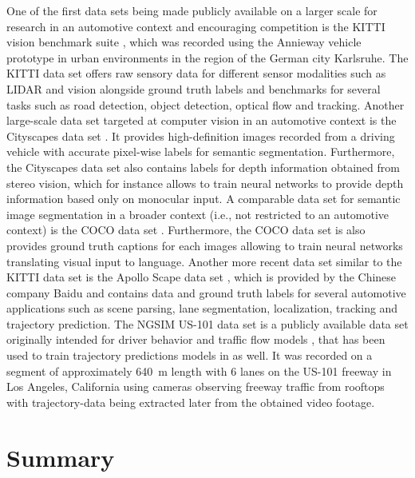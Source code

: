 One of the first data sets being made publicly available on a larger scale for research in an automotive context and encouraging competition is the KITTI vision benchmark suite \parencite{Geiger2013a}, which was recorded using the Annieway vehicle prototype  in urban environments in the region of the German city Karlsruhe.
The KITTI data set offers raw sensory data for different sensor modalities such as \ac{LIDAR} and vision alongside ground truth labels and benchmarks for several tasks such as road detection, object detection, optical flow and tracking.
Another large-scale data set targeted at computer vision in an automotive context is the Cityscapes data set \parencite{Cordts2016}. 
It provides high-definition images recorded from a driving vehicle with accurate pixel-wise labels for semantic segmentation.
Furthermore, the Cityscapes data set also contains labels for depth information obtained from stereo vision, which for instance allows to train neural networks to provide depth information based only on monocular input. 
A comparable data set for semantic image segmentation in a broader context (i.e., not restricted to an automotive context) is the 
\ac{COCO}  data set \parencite{Lin2014}.
Furthermore, the \ac{COCO} data set is also provides ground truth captions for each images allowing to train neural networks translating visual input to language. 
Another more recent data set similar to the KITTI data set is the Apollo Scape data set \parencite{Huang2018}, which is provided by the Chinese company Baidu and contains data and ground truth labels for several automotive applications such as scene parsing, lane segmentation, localization, tracking and trajectory prediction.
The \ac{NGSIM} US-101 data set \parencite{NGSIM-US101} is a publicly available data set originally intended for driver behavior and traffic flow models \parencite{He2017}, that has been used to train trajectory predictions models in \textcite{Altche2018, Deo2018} as well.
It was recorded on a segment of approximately \SI{640}{\meter} length with \num{6} lanes on the US-101 freeway in Los Angeles, California  using cameras observing freeway traffic from rooftops with trajectory-data being extracted later from the obtained video footage.

\section{Summary}
\label{sec:related_work_summary}

